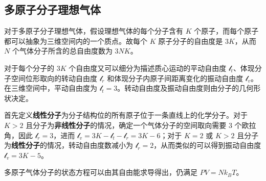 \subsection{多原子分子理想气体}
对于多原子分子理想气体，假设理想气体的每个分子含有 $K$ 个原子，而每个原子都可以抽象为三维空间内的一个质点。故每个 $K$ 原子分子的自由度是 $3K$，从而 $N$ 个气体分子所含的总自由度数为 $3NK$。

对于每个分子的 $3K$ 个自由度又可以细分为描述质心运动的平动自由度 $\mathcal{l}_t$、体现分子空间位形取向的转动自由度 $\mathcal{l}_r$ 和体现分子内原子间距离变化的振动自由度 $\mathcal{l}_v$。在三维空间中，平动自由度为 $\mathcal{l}_t = 3$。转动自由度及振动自由度则由分子的几何形状决定。

首先定义\textbf{线性分子}为分子结构位的所有原子位于一条直线上的化学分子。对于 $K > 2$ 且分子为\textbf{非线性分子}的情况，确定一个气体分子的空间取向需要 $3$ 个欧拉角，因此 $\mathcal{l}_r = 3$，进而 $\mathcal{l}_v = 3K-\mathcal{l}_t-\mathcal{l}_r = 3K-6$；对于 $K=2$ 或 $K>2$ 且分子为\textbf{线性分子}的情况，转动自由度数减小为 $\mathcal{l}_r = 2$，从而类似的可以得到振动自由度 $\mathcal{l}_v = 3K-5$。

多原子气体分子的状态方程可以由其自由能求导得出，仍满足 $PV=Nk_BT$。
